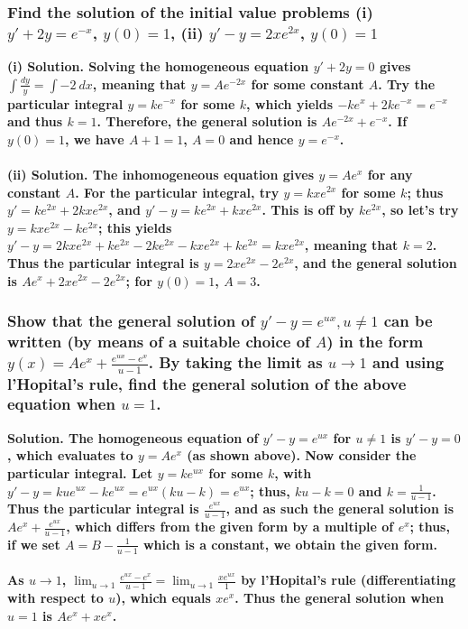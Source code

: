 \documentclass{article}
\begin{document}
 \subsubsection*{Find the solution of the initial value problems (i) $y'+2y = e^{-x}$, $y(0)=1$, (ii) $y'-y = 2xe^{2x}$, $y(0)=1$}
\bf (i) Solution. \normalfont Solving the homogeneous equation $y' + 2y = 0$ gives $\int \frac{dy}{y} = \int -2 \ dx$, meaning that $y = Ae^{-2x}$ for some constant $A$. Try the particular integral $y = ke^{-x}$ for some $k$, which yields $-ke^{x} + 2ke^{-x} = e^{-x}$ and thus $k = 1$. Therefore, the general solution is $Ae^{-2x} + e^{-x}$. If $y(0) = 1$, we have $A + 1 = 1$, $A = 0$ and hence $y = e^{-x}$. 
\\ \\
\bf (ii) Solution. \normalfont The inhomogeneous equation gives $y=Ae^{x}$ for any constant $A$. For the particular integral, try $y=kxe^{2x}$ for some $k$; thus $y' = ke^{2x} + 2kxe^{2x}$, and $y' - y = ke^{2x} + kxe^{2x}$. This is off by $ke^{2x}$, so let's try $y=kxe^{2x} - ke^{2x}$; this yields $y' - y = 2kxe^{2x} + ke^{2x} - 2ke^{2x} -kxe^{2x} + ke^{2x} = kxe^{2x}$, meaning that $k=2$. Thus the particular integral is $y = 2xe^{2x} - 2e^{2x}$, and the general solution is $Ae^{x} + 2xe^{2x} - 2e^{2x}$; for $y(0) = 1$, $A = 3$.

\hrulefill
\subsubsection*{Show that the general solution of $y' - y = e^{ux}, u\neq 1$ can be written (by means of a suitable choice of $A$) in the form $y(x) = Ae^{x} + \frac{e^{ux} - e^x}{u-1}$. By taking the limit as $u \to 1$ and using l'Hopital's rule, find the general solution of the above equation when $u = 1$.}
\bf Solution. \normalfont The homogeneous equation of $y' - y = e^{ux}$ for $u \neq 1$ is $y'-y = 0$, which evaluates to $y=Ae^{x}$ (as shown above). Now consider the particular integral. Let $y = ke^{ux}$ for some $k$, with $y'-y = kue^{ux} - ke^{ux} = e^{ux}(ku - k) = e^{ux}$; thus, $ku - k =0$ and $k = \frac{1}{u-1}$. Thus the particular integral is $\frac{e^{ux}}{u-1}$, and as such the general solution is $Ae^x + \frac{e^{ux}}{u-1}$, which differs from the given form by a multiple of $e^x$; thus, if we set $A = B - \frac{1}{u-1}$ which is a constant, we obtain the given form. \\ \\
As $u \to 1$, $\lim_{u\to 1} \frac{e^{ux} - e^x}{u-1} = \lim_{u\to 1} \frac{xe^{ux}}{1}$ by l'Hopital's rule (differentiating with respect to $u$), which equals $xe^{x}$. Thus the general solution when $u=1$ is $Ae^x + xe^x$.
 
\end{document}
